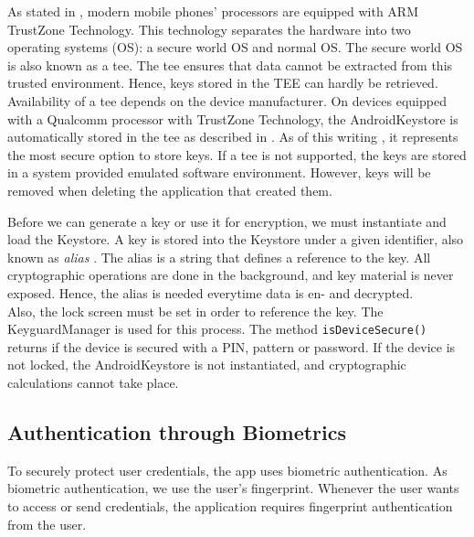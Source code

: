 As stated in \cite{CooijmansRP14}, modern mobile phones' processors are equipped with ARM TrustZone Technology. This technology separates the hardware into two operating systems (OS): a secure world OS and normal OS. The secure world OS is also known as a \gls{tee}. The \gls{tee} ensures that data cannot be extracted from this trusted environment. Hence, keys stored in the TEE can hardly be retrieved. Availability of a \gls{tee} depends on the device manufacturer. On devices equipped with a Qualcomm processor with TrustZone Technology, the AndroidKeystore is automatically stored in the \gls{tee} as described in \cite{CooijmansRP14}. As of this writing \cite{SecureDataEncryption}, it represents the most secure option to store keys. If a \gls{tee} is not supported, the keys are stored in a system provided emulated software environment. However, keys will be removed when deleting the application that created them.

Before we can generate a key or use it for encryption, we must instantiate and load the Keystore. A key is stored into the Keystore under a given identifier, also known as \textit{alias} \cite{CooijmansRP14}. The alias is a string that defines a reference to the key. All cryptographic operations are done in the background, and key material is never exposed. Hence, the alias is needed everytime data is en- and decrypted. \\
Also, the lock screen must be set in order to reference the key. The KeyguardManager is used for this process. The method \texttt{isDeviceSecure()} returns if the device is secured with a PIN, pattern or password. If the device is not locked, the AndroidKeystore is not instantiated, and cryptographic calculations cannot take place. \\




\subsection{Authentication through Biometrics} \label{arch_authenticate}
To securely protect user credentials, the app uses biometric authentication. As biometric authentication, we use the user's fingerprint. Whenever the user wants to access or send credentials, the application requires fingerprint authentication from the user.


